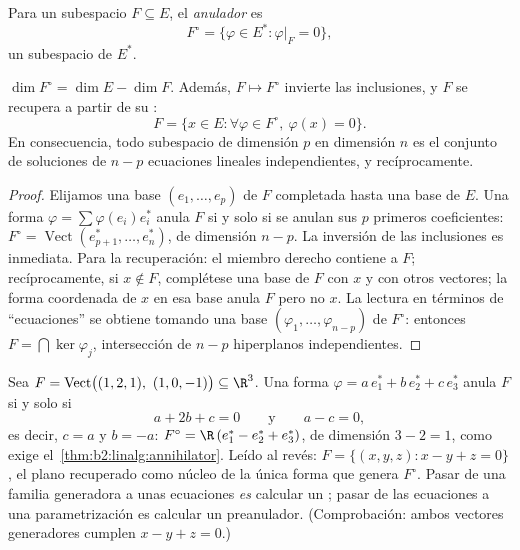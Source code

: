 \begin{definition}[Anulador]\label{def:b2:linalg:annihilator}
Para un subespacio $F \subseteq E$, el
\emph{anulador} es
\[
F^{\circ} = \{\varphi \in E^* : \varphi|_F = 0\},
\]
un subespacio de $E^*$.
\end{definition}

\begin{theorem}\label{thm:b2:linalg:annihilator}
$\dim F^{\circ} = \dim E - \dim F$. Además, $F \mapsto F^\circ$
invierte las inclusiones, y $F$ se recupera a partir de su :
\[
F = \{x \in E : \forall\varphi \in F^\circ,\ \varphi(x) = 0\}.
\]
En consecuencia, todo subespacio de dimensión $p$ en dimensión $n$ es
el conjunto de soluciones de $n - p$ ecuaciones lineales
independientes, y recíprocamente.
\end{theorem}

\begin{proof}
Elijamos una base $(e_1, \dots, e_p)$ de $F$ completada hasta una base
de $E$. Una forma $\varphi = \sum \varphi(e_i) e_i^*$ anula $F$ si y
solo si se anulan sus $p$ primeros coeficientes: $F^\circ =
\operatorname{Vect}(e_{p+1}^*, \dots, e_n^*)$, de dimensión $n - p$.
La inversión de las inclusiones es inmediata. Para la recuperación:
el miembro derecho contiene a $F$; recíprocamente, si $x \notin F$,
complétese una base de $F$ con $x$ y con otros vectores; la forma
coordenada de $x$ en esa base anula $F$ pero no $x$. La lectura en
términos de ``ecuaciones'' se obtiene tomando una base $(\varphi_1,
\dots, \varphi_{n-p})$ de $F^\circ$: entonces $F = \bigcap
\ker\varphi_j$, intersección de $n - p$ hiperplanos independientes.
\end{proof}

\begin{example}\label{ex:b2:linalg:annihilatorwork}
Sea $F = \operatorname{Vect}\bigl((1, 2, 1),\ (1, 0, -1)\bigr)
\subseteq \R^3$. Una forma $\varphi = a\,e_1^* + b\,e_2^* +
c\,e_3^*$ anula $F$ si y solo si
\[
a + 2b + c = 0
\qquad\text{y}\qquad
a - c = 0 ,
\]
es decir, $c = a$ y $b = -a$: $F^\circ = \R\,(e_1^* - e_2^* +
e_3^*)$, de dimensión $3 - 2 = 1$, como exige el~\cref{thm:b2:linalg:annihilator}. Leído al revés: $F = \{(x, y, z)
: x - y + z = 0\}$, el plano recuperado como núcleo de la única
forma que genera $F^\circ$. Pasar de una familia generadora a unas
ecuaciones \emph{es} calcular un ; pasar de las ecuaciones a
una parametrización es calcular un preanulador. (Comprobación:
ambos vectores generadores cumplen $x - y + z = 0$.)
\end{example}

